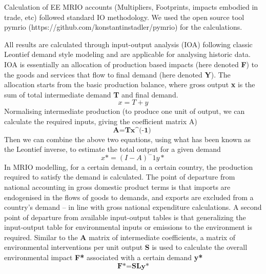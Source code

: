 Calculation of EE MRIO accounts (Multipliers, Footprints, impacts embodied in trade, etc) followed
standard IO methodology. We used the open source tool pymrio (https://github.com/konstantinstadler/pymrio) for the calculations.

All results are  calculated through input-output analysis (IOA) following classic Leontief demand style modeling and are applicable for analysing historic data. IOA is essentially an allocation of production based impacts (here denoted \textbf{F}) to the goods and services that flow to final demand (here denoted \textbf{Y}). The allocation starts from the basic production balance, where gross output \textbf{x} is the sum of total intermediate demand \textbf{T} and final demand. \begin{equation}x=T+y
\end{equation}
Normalising intermediate production (to produce one unit of output, we can calculate the required inputs, giving the coefficient matrix A)
\begin{equation}
\textbf{A=Tx^(-1) }
\end{equation}
Then we can combine the above two equations, using what has been known as the Leontief inverse, to estimate the total output for a given demand
\begin{equation}
x*=(I-A)^-1 y*
\end{equation}
In MRIO modelling, for a certain demand, in a certain country, the production required to satisfy the demand is calculated. The point of departure from national accounting in gross domestic product terms is that imports are endogenised in the flows of goods to demands, and exports are excluded from a country’s demand – in line with gross national expenditure calculations. A second point of departure from available input-output tables is that generalizing the input-output table for environmental inputs or emissions to the environment is required. Similar to the \textbf{A} matrix of intermediate coefficients, a matrix of environmental interventions per unit output \textbf{S} is used to calculate the overall environmental impact \textbf{F*} associated with a certain demand \textbf{y*} 
\begin{equation}
\textbf{F*=SLy*}
\end{equation}